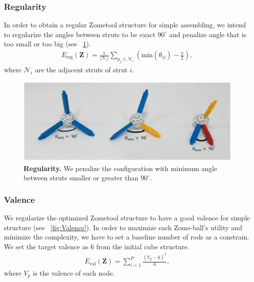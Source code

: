 
\subsubsection{Regularity}
In order to obtain a regular Zometool structure for simple assembling, we intend to regularize the angles between struts to be exact $90^\circ$ and penalize angle that is too small or too big (see \figname~\ref{fig:Regularity}).
\begin{align}
E_{\text{reg}}(\mathbf{Z}) = \frac{1}{|\mathcal{N}_i|} \sum_{p_j\in\mathcal{N}_i} (\text{min}(\theta_{ij})-\frac{\pi}{2}),
\end{align}
where $\mathcal{N}_i$ are the adjacent struts of strut $i$.

\begin{figure}[ht]
\centering
\includegraphics[width=1.0\linewidth]{figs/Regularity.pdf} 
\caption{\textbf{Regularity.} We penalize the configuration with minimum angle between struts smaller or greater than $90^\circ$.}
\label{fig:Regularity}
\end{figure}

\subsubsection{Valence}
We regularize the optimized Zometool structure to have a good valence for simple structure (see \figname~\ref{fig:Valence}). 
In order to maximize each Zome-ball's utility and minimize the complexity, we have to set a baseline number of rods as a constrain.
We set the target valence as $6$ from the initial cube structure.
\begin{align}
E_{\text{val}}(\mathbf{Z}) = \sum_{i=1}^{P} \frac{(V_p-6)^2}{6},
\end{align}
where $V_p$ is the valence of each node.

